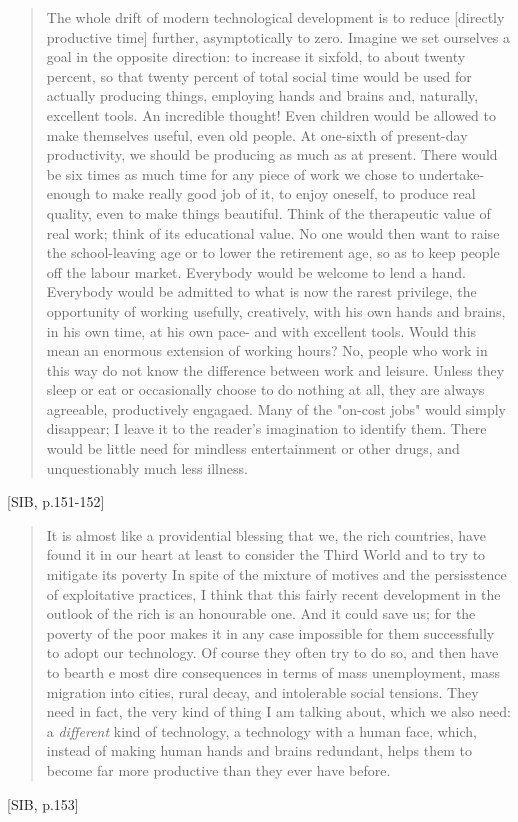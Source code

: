 \begin{quote}
  The whole drift of modern technological development is to reduce [directly productive time] further, asymptotically to zero. Imagine we set ourselves a goal in the opposite direction: to increase it sixfold, to about twenty percent, so that twenty percent of total social time would be used for actually producing things, employing hands and brains and, naturally, excellent tools. An incredible thought! Even children would be allowed to make themselves useful, even old people. At one-sixth of present-day productivity, we should be producing as much as at present. There would be six times as much time for any piece of work we chose to undertake- enough to make really good job of it, to enjoy oneself, to produce real quality, even to make things beautiful. Think of the therapeutic value of real work; think of its educational value. No one would then want to raise the school-leaving age or to lower the retirement age, so as to keep people off the labour market. Everybody would be welcome to lend a hand. Everybody would be admitted to what is now the rarest privilege, the opportunity of working usefully, creatively, with his own hands and brains, in his own time, at his own pace- and with excellent tools. Would this mean an enormous extension of working hours? No, people who work in this way do not know the difference between work and leisure. Unless they sleep or eat or occasionally choose to do nothing at all, they are always agreeable, productively engagaed. Many of the "on-cost jobs" would simply disappear; I leave it to the reader's imagination to identify them. There would be little need for mindless entertainment or other drugs, and unquestionably much less illness.
\end{quote}[SIB, p.151-152]

\begin{quote}
  It is almost like a providential blessing that we, the rich countries, have found it in our heart at least to consider the Third World and to try to mitigate its poverty In spite of the mixture of motives and the persisstence of exploitative practices, I think that this fairly recent development in the outlook of the rich is an honourable one. And it could save us; for the poverty of the poor makes it in any case impossible for them successfully to adopt our technology. Of course they often try to do so, and then have to bearth e most dire consequences in terms of mass unemployment, mass migration into cities, rural decay, and intolerable social tensions. They need in fact, the very kind of thing I am talking about, which we also need: a \textit{different} kind of technology, a technology with a human face, which, instead of making human hands and brains redundant, helps them to become far more productive than they ever have before.
\end{quote}[SIB, p.153]

